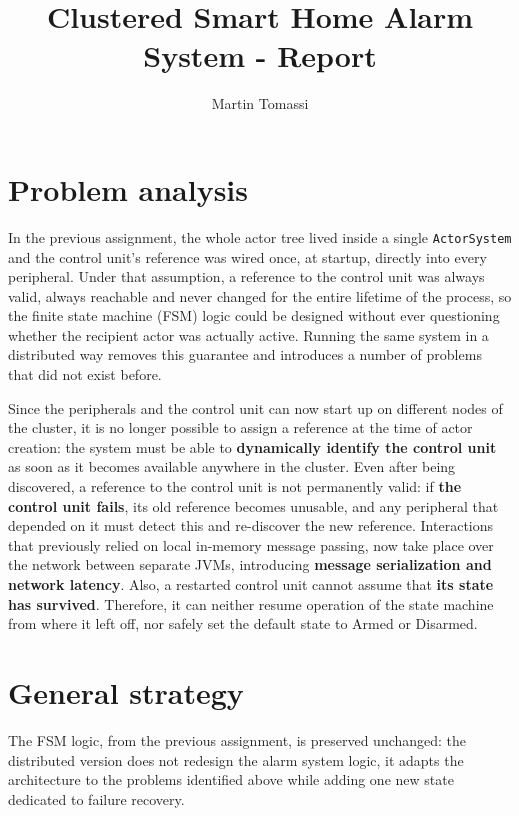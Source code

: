 \documentclass[11pt,a4paper]{article}
\title{\textbf{Clustered Smart Home Alarm System - Report}}
\author{Martin Tomassi}
\date{}
\begin{document}
\maketitle

\section{Problem analysis}

In the previous assignment, the whole actor tree lived inside a single \texttt{ActorSystem} and the control unit's reference was wired once, at startup, directly into every peripheral. Under that assumption, a reference to the control unit was always valid, always reachable and never changed for the entire lifetime of the process, so the finite state machine (FSM) logic could be designed without ever questioning whether the recipient actor was actually active. Running the same system in a distributed way removes this guarantee and introduces a number of problems that did not exist before. 

Since the peripherals and the control unit can now start up on different nodes of the cluster, it is no longer possible to assign a reference at the time of actor creation: the system must be able to \textbf{dynamically identify the control unit} as soon as it becomes available anywhere in the cluster. Even after being discovered, a reference to the control unit is not permanently valid: if \textbf{the control unit fails}, its old reference becomes unusable, and any peripheral that depended on it must detect this and re-discover the new reference. Interactions that previously relied on local in-memory message passing, now take place over the network between separate JVMs, introducing \textbf{message serialization and network latency}. Also, a restarted control unit cannot assume that \textbf{its state has survived}. Therefore, it can neither resume operation of the state machine from where it left off, nor safely set the default state to Armed or Disarmed.

\section{General strategy}

The FSM logic, from the previous assignment, is preserved unchanged: the distributed version does not redesign the alarm system logic, it adapts the architecture to the problems identified above while adding one new state dedicated to failure recovery. 
\end{document}
